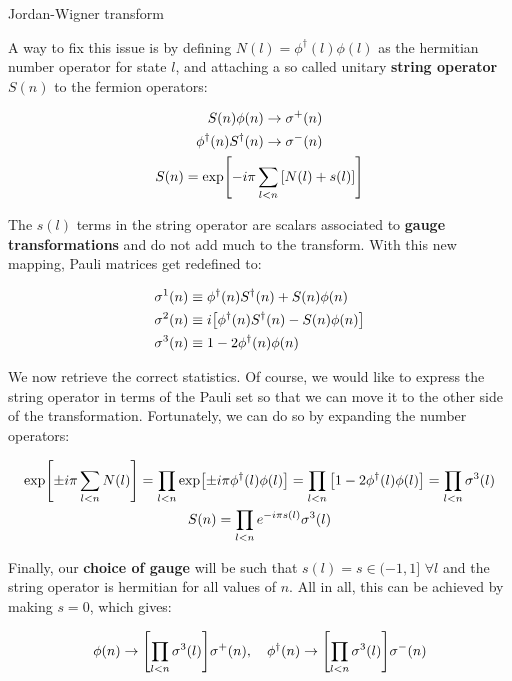 \documentclass[9pt, handout, aspectratio=169]{beamer}	%
\begin{document}
\begin{frame}[allowframebreaks]{Jordan-Wigner transform}
\break

	A way to fix this issue is by defining $N(l)=\phi^{\dagger}(l)\phi(l)$ as the hermitian number operator for state $l$, and attaching a so called unitary \textbf{string operator} $S(n)$ to the fermion operators:

	\begin{gather*}
		\begin{split}
			S(n)\phi(n) &\rightarrow \sigma^{+}(n) \\
			\phi^{\dagger}(n)S^{\dagger}(n) &\rightarrow \sigma^{-}(n)
		\end{split} \\
		S(n) = \exp[ -i\pi \sum_{l<n} \qty[N(l)+s(l)] ]
	\end{gather*}

	\vspace{-0.5em}

	The $s(l)$ terms in the string operator are scalars associated to \textbf{gauge transformations} and do not add much to the transform. With this new mapping, Pauli matrices get redefined to:

	\begin{align*}
		\sigma^{1}(n) &\equiv
			\phi^{\dagger}(n)S^{\dagger}(n) + S(n)\phi(n) \\
		\sigma^{2}(n) &\equiv
			i\qty[\phi^{\dagger}(n)S^{\dagger}(n) - S(n)\phi(n)] \\
		\sigma^{3}(n) &\equiv
			1 - 2\phi^{\dagger}(n)\phi(n)
	\end{align*}

\break

	We now retrieve the correct statistics. Of course, we would like to express the string operator in terms of the Pauli set so that we can move it to the other side of the transformation. Fortunately, we can do so by expanding the number operators:

	\begin{gather*}
	  \exp[\pm i\pi \sum_{l<n} N(l)] =
		  \prod_{l<n}\exp[\pm i\pi \phi^{\dagger}(l)\phi(l)] =
		  \prod_{l<n}\qty[1-2\phi^{\dagger}(l)\phi(l)] =
		  \prod_{l<n}\sigma^3(l) \\
		S(n) = \prod_{l<n} e^{-i\pi s(l)} \sigma^3(l)
	\end{gather*}

	Finally, our \textbf{choice of gauge} will be such that $s(l) = s \in (-1,1]$ $\forall l$ and the string operator is hermitian for all values of $n$. All in all, this can be achieved by making $s=0$, which gives:

	\begin{gather*}
		\phi(n) \ra \qty[\prod_{l<n} \sigma^3(l)]\sigma^{+}(n) \qc
		\phi^{\dagger}(n) \ra \qty[\prod_{l<n} \sigma^3(l)]\sigma^{-}(n)
	\end{gather*}

\end{frame}
\end{document}
